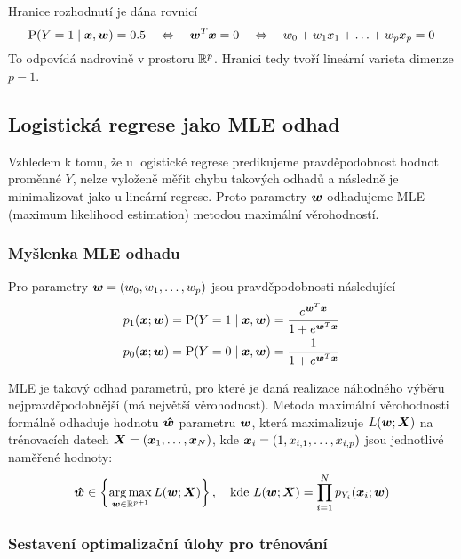 Hranice rozhodnutí je dána rovnicí
\begin{equation*}
    \text{P} (Y=1 \mid \bm{x}, \bm{w} ) = 0.5
    \quad \Leftrightarrow \quad
    \bm{w}^T\bm{x} = 0
    \quad \Leftrightarrow \quad
    w_0 + w_1 x_1 + \ldots + w_p x_p = 0
\end{equation*}
To odpovídá nadrovině v prostoru $\mathbb{R}^p$. Hranici tedy tvoří lineární varieta dimenze $p-1$.

\subsection{Logistická regrese jako MLE odhad}

Vzhledem k tomu, že u logistické regrese predikujeme pravděpodobnost hodnot proměnné $Y$, nelze vyloženě měřit chybu takových odhadů a následně je minimalizovat jako u lineární regrese. Proto parametry $\bm{w}$ odhadujeme MLE (maximum likelihood estimation) metodou maximální věrohodností.

\subsubsection{Myšlenka MLE odhadu}

Pro parametry $\bm{w} = (w_0, w_1, \ldots, w_p)$ jsou pravděpodobnosti následující
\begin{align*}
    p_{1}(\bm{x}; \bm{w}) & = \text{P} (Y=1 \mid \bm{x}, \bm{w} ) = \frac{e^{\bm{w}^T\bm{x}}}{1 + e^{\bm{w}^T\bm{x}}} \\
    p_{0}(\bm{x}; \bm{w}) & = \text{P} (Y=0 \mid \bm{x}, \bm{w} ) = \frac{1}{1 + e^{\bm{w}^T\bm{x}}}
\end{align*}

MLE je takový odhad parametrů, pro které je daná realizace náhodného výběru nejpravděpodobnější (má největší věrohodnost). Metoda maximální věrohodnosti formálně odhaduje hodnotu $\bm{\hat{w}}$  parametru $\bm{w}$, která maximalizuje $L(\bm{w}; \bm{X})$ na trénovacích datech $\bm{X} = (\bm{x}_1, \ldots, \bm{x}_N)$, kde $\bm{x}_i = (1, x_{i, 1}, \ldots, x_{i, p})$ jsou jednotlivé naměřené hodnoty:
\begin{equation*}
    \bm{\hat{w}} \in \left\{\operatorname*{arg\,max}_{\bm{w} \in \mathbb{R}^{p+1}} L(\bm{w}; \bm{X})\right\},
    \quad \text{kde }
    L(\bm{w}; \bm{X}) = \prod_{i=1}^{N} p_{Y_i}(\bm{x}_i; \bm{w})
\end{equation*}

\subsubsection{Sestavení optimalizační úlohy pro trénování}

